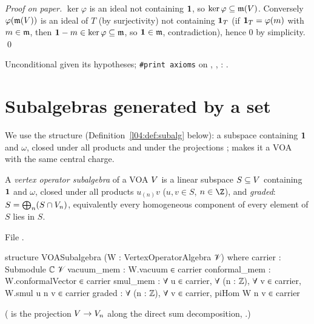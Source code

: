 \emph{Proof on paper.} $\ker\varphi$ is an ideal not containing $\mathbf{1}$, so $\ker\varphi\subseteq
\mathfrak{m}(V)$. Conversely $\varphi(\mathfrak{m}(V))$ is an ideal of $T$ (by surjectivity) not containing
$\mathbf{1}_T$ (if $\mathbf{1}_T = \varphi(m)$ with $m\in\mathfrak{m}$, then $\mathbf{1}-m\in\ker\varphi\subseteq\mathfrak{m}$,
so $\mathbf{1}\in\mathfrak{m}$, contradiction), hence $0$ by simplicity. \qed
\begin{status}
Unconditional given its hypotheses; \texttt{\#print axioms} on \allowbreak{}\allowbreak{},
\allowbreak{}\allowbreak{}\allowbreak{}\allowbreak{}\allowbreak{}, : .
\end{status}

\section{Subalgebras generated by a set}\label{l04:sec:gen}

We use the structure
 (Definition~\ref{l04:def:subalg} below): a subspace containing $\mathbf{1}$ and $\omega$, closed under all products and
under the projections ; \allowbreak{} makes it a VOA with the same
central charge.

\begin{definition}\label{l04:def:subalg}
A \emph{vertex operator subalgebra} of a VOA $V$ is a linear subspace $S\subseteq V$ containing $\mathbf{1}$ and
$\omega$, closed under all products $u_{(n)}v$ ($u,v\in S$, $n\in\Z$), and \emph{graded}: $S = \bigoplus_n(S\cap V_n)$,
equivalently every homogeneous component of every element of $S$ lies in $S$.
\end{definition}
\noindent File .
\begin{leancode}
structure VOASubalgebra (W : VertexOperatorAlgebra 𝒱) where
  carrier : Submodule ℂ 𝒱
  vacuum_mem : W.vacuum ∈ carrier
  conformal_mem : W.conformalVector ∈ carrier
  smul_mem : ∀ u ∈ carrier, ∀ (n : ℤ), ∀ v ∈ carrier, W.smul u n v ∈ carrier
  graded : ∀ (n : ℤ), ∀ v ∈ carrier, piHom W n v ∈ carrier
\end{leancode}
( is the projection $V\to V_n$ along the direct sum decomposition,
.)

